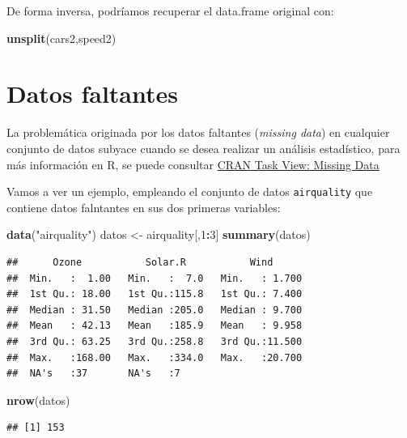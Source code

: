 \documentclass[
]{book}
\newenvironment{Shaded}{\begin{snugshade}}{\end{snugshade}}
\newcommand{\DecValTok}[1]{\textcolor[rgb]{0.00,0.00,0.81}{#1}}
\newcommand{\FunctionTok}[1]{\textcolor[rgb]{0.13,0.29,0.53}{\textbf{#1}}}
\newcommand{\NormalTok}[1]{#1}
\newcommand{\OtherTok}[1]{\textcolor[rgb]{0.56,0.35,0.01}{#1}}
\newcommand{\SpecialCharTok}[1]{\textcolor[rgb]{0.81,0.36,0.00}{\textbf{#1}}}
\newcommand{\StringTok}[1]{\textcolor[rgb]{0.31,0.60,0.02}{#1}}
\begin{document}
De forma inversa, podríamos recuperar el data.frame original con:

\begin{Shaded}
\begin{Highlighting}[]
\FunctionTok{unsplit}\NormalTok{(cars2,speed2)}
\end{Highlighting}
\end{Shaded}

\hypertarget{missing}{%
\section{Datos faltantes}\label{missing}}

La problemática originada por los datos faltantes (\emph{missing data}) en cualquier conjunto de datos subyace cuando se desea
realizar un análisis estadístico, para más información en R, se puede consultar \href{https://cran.r-project.org/web/views/MissingData.html}{CRAN Task View: Missing Data}

Vamos a ver un ejemplo, empleando el conjunto de datos \texttt{airquality} que contiene datos falntantes en sus dos primeras variables:

\begin{Shaded}
\begin{Highlighting}[]
\FunctionTok{data}\NormalTok{(}\StringTok{"airquality"}\NormalTok{)}
\NormalTok{datos }\OtherTok{\textless{}{-}}\NormalTok{ airquality[,}\DecValTok{1}\SpecialCharTok{:}\DecValTok{3}\NormalTok{]}
\FunctionTok{summary}\NormalTok{(datos)}
\end{Highlighting}
\end{Shaded}

\begin{verbatim}
##      Ozone           Solar.R           Wind       
##  Min.   :  1.00   Min.   :  7.0   Min.   : 1.700  
##  1st Qu.: 18.00   1st Qu.:115.8   1st Qu.: 7.400  
##  Median : 31.50   Median :205.0   Median : 9.700  
##  Mean   : 42.13   Mean   :185.9   Mean   : 9.958  
##  3rd Qu.: 63.25   3rd Qu.:258.8   3rd Qu.:11.500  
##  Max.   :168.00   Max.   :334.0   Max.   :20.700  
##  NA's   :37       NA's   :7
\end{verbatim}

\begin{Shaded}
\begin{Highlighting}[]
\FunctionTok{nrow}\NormalTok{(datos)}
\end{Highlighting}
\end{Shaded}

\begin{verbatim}
## [1] 153
\end{verbatim}
\end{document}
